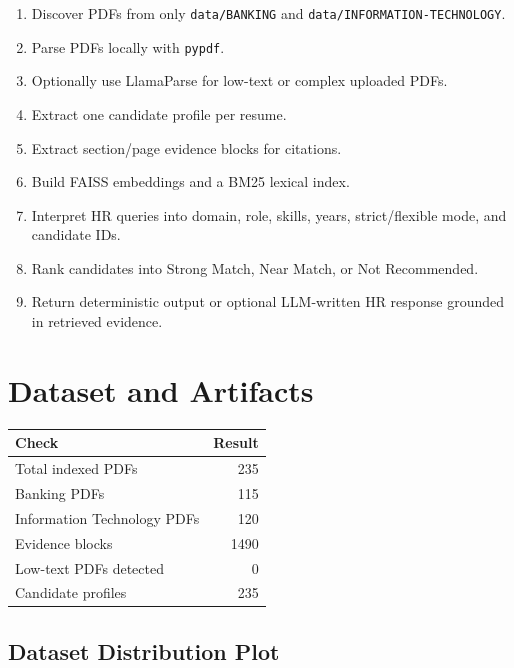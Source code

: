 \documentclass[11pt]{article}
\begin{document}
\begin{enumerate}[leftmargin=*]
  \item Discover PDFs from only \texttt{data/BANKING} and \texttt{data/INFORMATION-TECHNOLOGY}.
  \item Parse PDFs locally with \texttt{pypdf}.
  \item Optionally use LlamaParse for low-text or complex uploaded PDFs.
  \item Extract one candidate profile per resume.
  \item Extract section/page evidence blocks for citations.
  \item Build FAISS embeddings and a BM25 lexical index.
  \item Interpret HR queries into domain, role, skills, years, strict/flexible mode, and candidate IDs.
  \item Rank candidates into Strong Match, Near Match, or Not Recommended.
  \item Return deterministic output or optional LLM-written HR response grounded in retrieved evidence.
\end{enumerate}

\section{Dataset and Artifacts}

\begin{center}
\begin{tabularx}{0.82\linewidth}{|Y|r|}
\hline
\textbf{Check} & \textbf{Result} \\
\hline
Total indexed PDFs & 235 \\
\hline
Banking PDFs & 115 \\
\hline
Information Technology PDFs & 120 \\
\hline
Evidence blocks & 1490 \\
\hline
Low-text PDFs detected & 0 \\
\hline
Candidate profiles & 235 \\
\hline
\end{tabularx}
\end{center}

\subsection{Dataset Distribution Plot}

\begin{center}
\end{center}
\end{document}
